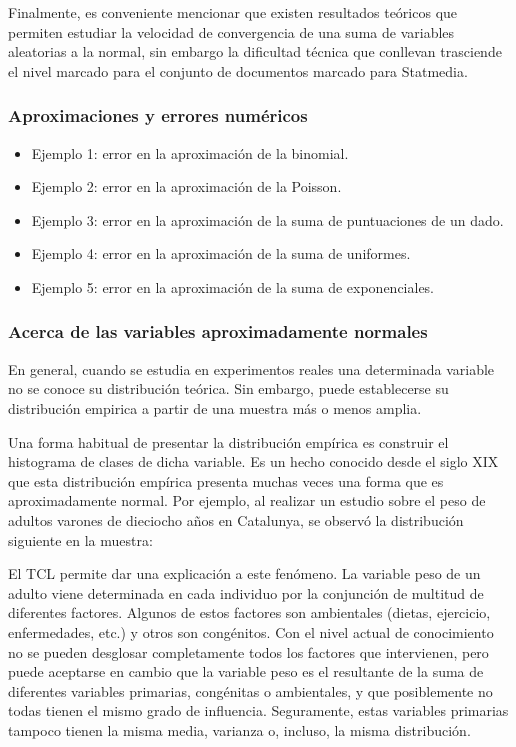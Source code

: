 \documentclass[
]{article}
\providecommand{\tightlist}{%
  \setlength{\itemsep}{0pt}\setlength{\parskip}{0pt}}
\begin{document}
Finalmente, es conveniente mencionar que existen resultados teóricos que permiten estudiar la velocidad de convergencia de una suma de variables aleatorias a la normal, sin embargo la dificultad técnica que conllevan trasciende el nivel marcado para el conjunto de documentos marcado para Statmedia.

\subsubsection{Aproximaciones y errores numéricos}\label{aproximaciones-y-errores-numuxe9ricos}

\begin{itemize}
\tightlist
\item
  Ejemplo 1: error en la aproximación de la binomial.
\item
  Ejemplo 2: error en la aproximación de la Poisson.
\item
  Ejemplo 3: error en la aproximación de la suma de puntuaciones de un dado.
\item
  Ejemplo 4: error en la aproximación de la suma de uniformes.
\item
  Ejemplo 5: error en la aproximación de la suma de exponenciales.
\end{itemize}

\subsubsection{Acerca de las variables aproximadamente normales}\label{acerca-de-las-variables-aproximadamente-normales}

En general, cuando se estudia en experimentos reales una determinada variable no se conoce su distribución teórica. Sin embargo, puede establecerse su distribución empirica a partir de una muestra más o menos amplia.

Una forma habitual de presentar la distribución empírica es construir el histograma de clases de dicha variable. Es un hecho conocido desde el siglo XIX que esta distribución empírica presenta muchas veces una forma que es aproximadamente normal. Por ejemplo, al realizar un estudio sobre el peso de adultos varones de dieciocho años en Catalunya, se observó la distribución siguiente en la muestra:

El TCL permite dar una explicación a este fenómeno. La variable peso de un adulto viene determinada en cada individuo por la conjunción de multitud de diferentes factores. Algunos de estos factores son ambientales (dietas, ejercicio, enfermedades, etc.) y otros son congénitos. Con el nivel actual de conocimiento no se pueden desglosar completamente todos los factores que intervienen, pero puede aceptarse en cambio que la variable peso es el resultante de la suma de diferentes variables primarias, congénitas o ambientales, y que posiblemente no todas tienen el mismo grado de influencia. Seguramente, estas variables primarias tampoco tienen la misma media, varianza o, incluso, la misma distribución.
\end{document}
